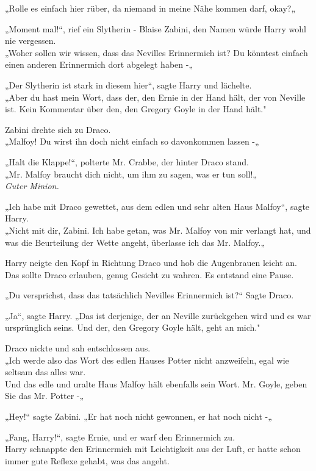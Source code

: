 {„Rolle es einfach hier rüber, da niemand in meine Nähe kommen darf, okay?„

„Moment mal!“, rief ein Slytherin - Blaise Zabini, den Namen würde Harry wohl nie vergessen.\\ „Woher sollen wir wissen, dass das Nevilles Erinnermich ist? Du könntest einfach einen anderen Erinnermich dort abgelegt haben -„

„Der Slytherin ist stark in diesem hier“, sagte Harry und lächelte.\\ „Aber du hast mein Wort, dass der, den Ernie in der Hand hält, der von Neville ist. Kein Kommentar über den, den Gregory Goyle in der Hand hält."

Zabini drehte sich zu Draco.\\ „Malfoy! Du wirst ihn doch nicht einfach so davonkommen lassen -„

„Halt die Klappe!“, polterte Mr. Crabbe, der hinter Draco stand.\\ „Mr. Malfoy braucht dich nicht, um ihm zu sagen, was er tun soll!„\\ \emph{Guter Minion.}

„Ich habe mit Draco gewettet, aus dem edlen und sehr alten Haus Malfoy“, sagte Harry.\\ „Nicht mit dir, Zabini. Ich habe getan, was Mr. Malfoy von mir verlangt hat, und was die Beurteilung der Wette angeht, überlasse ich das Mr. Malfoy.„

Harry neigte den Kopf in Richtung Draco und hob die Augenbrauen leicht an. Das sollte Draco erlauben, genug Gesicht zu wahren. Es entstand eine Pause.

„Du versprichst, dass das tatsächlich Nevilles Erinnermich ist?“ Sagte Draco.

„Ja“, sagte Harry. „Das ist derjenige, der an Neville zurückgehen wird und es war ursprünglich seins. Und der, den Gregory Goyle hält, geht an mich."

Draco nickte und sah entschlossen aus.\\ „Ich werde also das Wort des edlen Hauses Potter nicht anzweifeln, egal wie seltsam das alles war.\\ Und das edle und uralte Haus Malfoy hält ebenfalls sein Wort. Mr. Goyle, geben Sie das Mr. Potter -„

„Hey!“ sagte Zabini. „Er hat noch nicht gewonnen, er hat noch nicht -„

„Fang, Harry!“, sagte Ernie, und er warf den Erinnermich zu.\\ Harry schnappte den Erinnermich mit Leichtigkeit aus der Luft, er hatte schon immer gute Reflexe gehabt, was das angeht.

}
